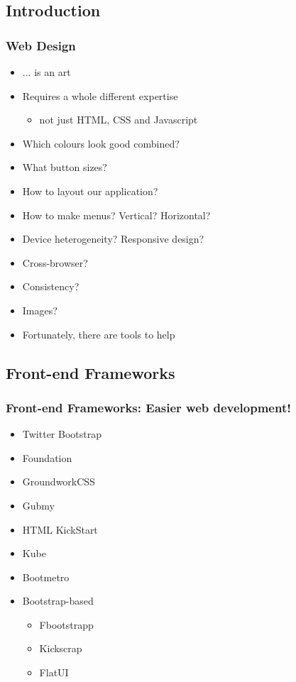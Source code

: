 \documentclass{beamer}
\begin{document}
\subsection{Introduction}
\begin{frame}[fragile]\frametitle{Web Design} 

  \begin{itemize}
    \item ... is an art
    \item Requires a whole different expertise
    \begin{itemize}
      \item not just HTML, CSS and Javascript
    \end{itemize}
    \item Which colours look good combined?
    \item What button sizes?
    \item How to layout our application?
    \item How to make menus? Vertical? Horizontal?
    \item Device heterogeneity? Responsive design?
    \item Cross-browser?
    \item Consistency?
    \item Images?
    \item Fortunately, there are tools to help
  \end{itemize}

\end{frame}


\subsection{Front-end Frameworks}
\begin{frame}[fragile]\frametitle{Front-end Frameworks: Easier web development!} 

  \begin{itemize}
    \item Twitter Bootstrap
    \item Foundation
    \item GroundworkCSS
    \item Gubmy
    \item HTML KickStart
    \item Kube
    \item Bootmetro
    \item Bootstrap-based
    \begin{itemize}
      \item Fbootstrapp
      \item Kickscrap
      \item FlatUI 
    \end{itemize}
  \end{itemize}

\end{frame}
\end{document}
